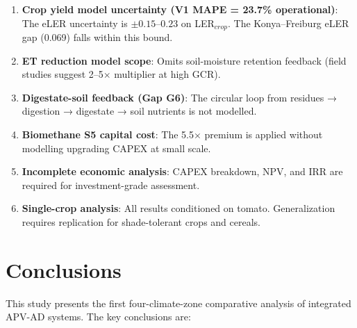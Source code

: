 \documentclass[12pt, a4paper]{article}
\begin{document}
\begin{enumerate}[leftmargin=*]
    \item \textbf{Crop yield model uncertainty (V1 MAPE = 23.7\% operational)}: The eLER uncertainty is $\pm0.15$–$0.23$ on LER$_{crop}$. The Konya–Freiburg eLER gap (0.069) falls within this bound.
    \item \textbf{ET reduction model scope}: Omits soil-moisture retention feedback (field studies suggest 2–5$\times$ multiplier at high GCR).
    \item \textbf{Digestate-soil feedback (Gap G6)}: The circular loop from residues → digestion → digestate → soil nutrients is not modelled.
    \item \textbf{Biomethane S5 capital cost}: The 5.5$\times$ premium is applied without modelling upgrading CAPEX at small scale.
    \item \textbf{Incomplete economic analysis}: CAPEX breakdown, NPV, and IRR are required for investment-grade assessment.
    \item \textbf{Single-crop analysis}: All results conditioned on tomato. Generalization requires replication for shade-tolerant crops and cereals.
\end{enumerate}

\section{Conclusions}

\hspace{1cm}This study presents the first four-climate-zone comparative analysis of integrated APV-AD systems. The key conclusions are:
\end{document}
